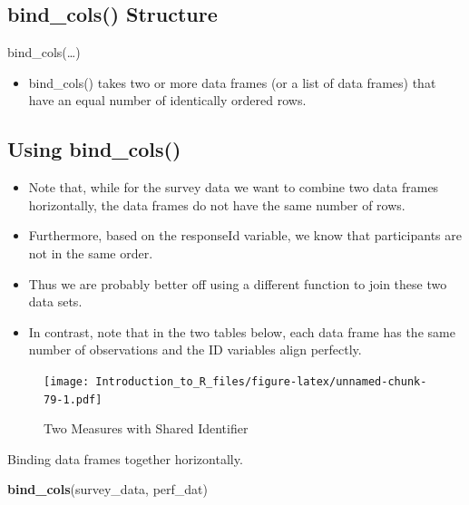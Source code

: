 \documentclass[]{book}
\newenvironment{Shaded}{\begin{snugshade}}{\end{snugshade}}
\newcommand{\KeywordTok}[1]{\textcolor[rgb]{0.13,0.29,0.53}{\textbf{#1}}}
\newcommand{\NormalTok}[1]{#1}
\providecommand{\tightlist}{%
  \setlength{\itemsep}{0pt}\setlength{\parskip}{0pt}}
\theoremstyle{definition}
\theoremstyle{definition}
\theoremstyle{definition}
\theoremstyle{remark}
\let\BeginKnitrBlock\begin \let\EndKnitrBlock\end
\begin{document}
\hypertarget{bind_cols-structure}{%
\subsection{bind\_cols() Structure}\label{bind_cols-structure}}

bind\_cols(\ldots{})

\begin{itemize}
\tightlist
\item
  bind\_cols() takes two or more data frames (or a list of data frames) that have an equal number of identically ordered rows.
\end{itemize}

\hypertarget{using-bind_cols}{%
\subsection{Using bind\_cols()}\label{using-bind_cols}}

\begin{itemize}
\tightlist
\item
  Note that, while for the survey data we want to combine two data frames horizontally, the data frames do not have the same number of rows.
\item
  Furthermore, based on the responseId variable, we know that participants are not in the same order.
\item
  Thus we are probably better off using a different function to join these two data sets.
\item
  In contrast, note that in the two tables below, each data frame has the same number of observations and the ID variables align perfectly.
\end{itemize}

\begin{figure}
\centering
\texttt{[image: Introduction\_to\_R\_files/figure-latex/unnamed-chunk-79-1.pdf]}
\caption{\label{fig:unnamed-chunk-79}Two Measures with Shared Identifier}
\end{figure}

\BeginKnitrBlock{example}
\protect\hypertarget{exm:bindc}{}{\label{exm:bindc} }Binding data frames together horizontally.
\EndKnitrBlock{example}

\begin{Shaded}
\begin{Highlighting}[]
\KeywordTok{bind_cols}\NormalTok{(survey_data, perf_dat)}
\end{Highlighting}
\end{Shaded}
\end{document}
